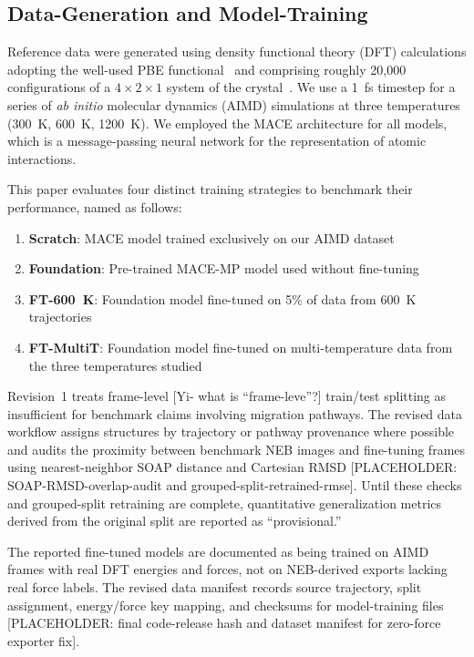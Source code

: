 \documentclass[pdflatex,sn-mathphys-num]{sn-jnl}%
\providecommand{\reviewermap}[3]{}
\theoremstyle{thmstyleone}%
\theoremstyle{thmstyletwo}%
\theoremstyle{thmstylethree}%
\begin{document}
\subsection{Data-Generation and Model-Training}

Reference data were generated using density functional theory (DFT) calculations adopting the well-used PBE functional~\citep{perdew_generalized_1996} and comprising roughly 20,000 configurations of a $4\times 2 \times 1$ system of the  crystal~\citep{jain2013commentary}. We use a  1~fs timestep  
for a series of \textit{ab initio} molecular dynamics (AIMD) simulations at three temperatures (300~K, 600~K, 1200~K). We employed the MACE architecture for all models, which is a message-passing neural network for the representation of atomic interactions.~\cite{batatia_mace_nodate} 


This paper evaluates four distinct training strategies to benchmark their performance, named as follows:
\begin{enumerate}
\item \textbf{Scratch}: MACE model trained exclusively on our AIMD dataset
\item \textbf{Foundation}: Pre-trained MACE-MP model used without fine-tuning
\item \textbf{FT-600~K}: Foundation model fine-tuned on 5\% of data from 600~K trajectories
\item \textbf{FT-MultiT}: Foundation model fine-tuned on multi-temperature data from the three temperatures studied
\end{enumerate}

\reviewermap{REV-A2/REV-C10}{pending}{Grouped split and train--test proximity audit are required before final RMSE and barrier-generalization claims.}
Revision~1 treats frame-level [Yi- what is ``frame-leve''?]  train/test splitting as insufficient for benchmark claims involving migration pathways. The revised data workflow assigns structures by trajectory or pathway provenance where possible and audits the proximity between benchmark NEB images and fine-tuning frames using nearest-neighbor SOAP distance and Cartesian RMSD [PLACEHOLDER: SOAP-RMSD-overlap-audit and grouped-split-retrained-rmse]. Until these checks and grouped-split retraining are complete, quantitative generalization metrics derived from the original split are reported as ``provisional.''

\reviewermap{REV-C8}{pending-release}{Zero-force NEB exporters are excluded from reported training provenance; final release hash remains pending.}
The reported fine-tuned models are documented as being trained on AIMD frames with real DFT energies and forces, not on NEB-derived exports lacking real force labels. The revised data manifest records source trajectory, split assignment, energy/force key mapping, and checksums for model-training files [PLACEHOLDER: final code-release hash and dataset manifest for zero-force exporter fix].
\end{document}
